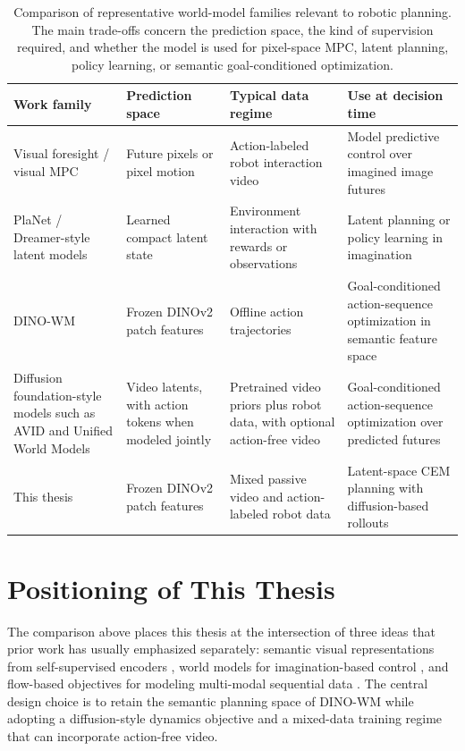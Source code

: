 \documentclass[12pt]{report}
\begin{document}
\begin{table}[h]
\caption{Comparison of representative world-model families relevant to robotic planning. The main trade-offs concern the prediction space, the kind of supervision required, and whether the model is used for pixel-space MPC, latent planning, policy learning, or semantic goal-conditioned optimization.}
\label{tab:related-world-model-families}
\begin{center}
\small
\begin{tabular}{@{}L{0.18\textwidth} L{0.22\textwidth} L{0.22\textwidth} L{0.25\textwidth}@{}}
\toprule
\textbf{Work family} & \textbf{Prediction space} & \textbf{Typical data regime} & \textbf{Use at decision time} \\
\midrule
Visual foresight / visual MPC & Future pixels or pixel motion & Action-labeled robot interaction video & Model predictive control over imagined image futures \\
PlaNet / Dreamer-style latent models & Learned compact latent state & Environment interaction with rewards or observations & Latent planning or policy learning in imagination \\
DINO-WM & Frozen DINOv2 patch features & Offline action trajectories & Goal-conditioned action-sequence optimization in semantic feature space \\
Diffusion foundation-style models such as AVID and Unified World Models & Video latents, with action tokens when modeled jointly & Pretrained video priors plus robot data, with optional action-free video & Goal-conditioned action-sequence optimization over predicted futures \\
\midrule
This thesis & Frozen DINOv2 patch features & Mixed passive video and action-labeled robot data & Latent-space CEM planning with diffusion-based rollouts \\
\bottomrule
\end{tabular}
\end{center}
\end{table}

\section{Positioning of This Thesis}
The comparison above places this thesis at the intersection of three ideas that prior work has usually emphasized separately: semantic visual representations from self-supervised encoders \cite{oquab2023dinov2}, world models for imagination-based control \cite{ha2018worldmodels,hafner2019planet,hafner2023dreamerv3}, and flow-based objectives for modeling multi-modal sequential data \cite{lipman2023flowmatching,liu2022rectifiedflow}. The central design choice is to retain the semantic planning space of DINO-WM while adopting a diffusion-style dynamics objective and a mixed-data training regime that can incorporate action-free video.
\end{document}
